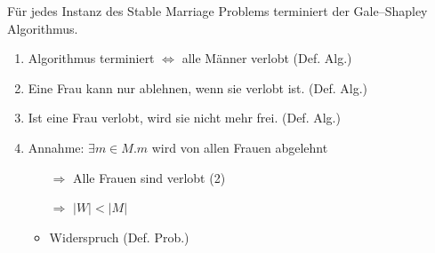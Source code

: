 \begin{frame}
  \begin{Lemma}
  \label{gsa_terminiert}
    Für jedes Instanz des Stable Marriage Problems terminiert der Gale–Shapley Algorithmus.
  \end{Lemma}

  \begin{Beweis}
  \label{gsa_terminiert_bew}
    \begin{enumerate}[<+->]
      \item Algorithmus terminiert $\Longleftrightarrow$ alle Männer verlobt (Def. Alg.)
      \item Eine Frau kann nur ablehnen, wenn sie verlobt ist. (Def. Alg.)
      \item Ist eine Frau verlobt, wird sie nicht mehr frei. (Def. Alg.)
      \item Annahme: $\exists m \in M. m$ wird von allen Frauen abgelehnt
      \begin{itemize}
          \item[$\Longrightarrow$] Alle Frauen sind verlobt (2)
          \item[$\Longrightarrow$] $|W| < |M|$
          \item Widerspruch (Def. Prob.)
       \end{itemize}
    \end{enumerate}
  \end{Beweis}
\end{frame}

